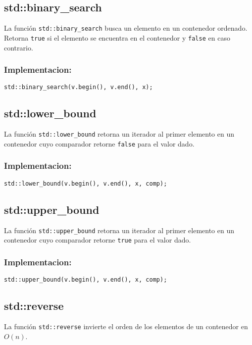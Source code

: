 \subsection{std::binary\_search}
\label{subsec:std_binary_search}
La función \texttt{std::binary\_search} busca un elemento en un contenedor ordenado. Retorna \texttt{true} si el elemento se encuentra en el contenedor y \texttt{false} en caso contrario.

\subsubsection{Implementacion:}
\begin{lstlisting}
std::binary_search(v.begin(), v.end(), x);
\end{lstlisting}

\subsection{std::lower\_bound}
\label{subsec:std_lower_bound}
La función \texttt{std::lower\_bound} retorna un iterador al primer elemento en un contenedor cuyo comparador retorne \texttt{false} para el valor dado.

\subsubsection{Implementacion:}
\begin{lstlisting}
std::lower_bound(v.begin(), v.end(), x, comp);
\end{lstlisting}

\subsection{std::upper\_bound}
\label{subsec:std_upper_bound}
La función \texttt{std::upper\_bound} retorna un iterador al primer elemento en un contenedor cuyo comparador retorne \texttt{true} para el valor dado.

\subsubsection{Implementacion:}
\begin{lstlisting}
std::upper_bound(v.begin(), v.end(), x, comp);
\end{lstlisting}

\subsection{std::reverse}
\label{subsec:std_reverse}
La función \texttt{std::reverse} invierte el orden de los elementos de un contenedor en $O(n)$. 

